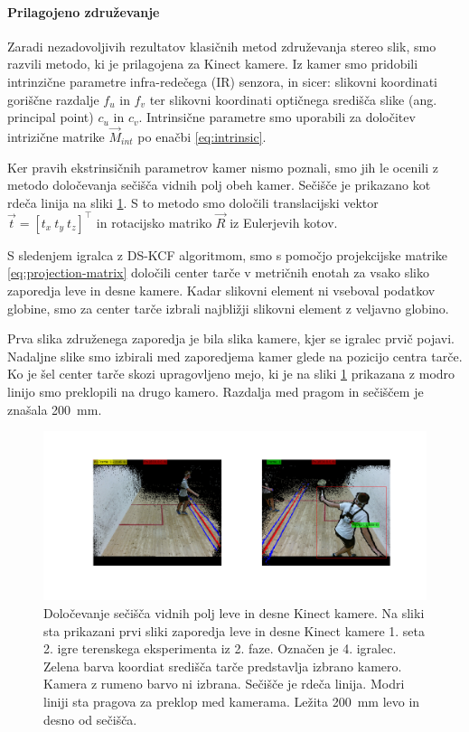 \paragraph{Prilagojeno združevanje}
Zaradi nezadovoljivih rezultatov klasičnih metod združevanja stereo slik, smo razvili metodo, ki je prilagojena za Kinect kamere. Iz kamer smo pridobili intrinzične parametre infra-redečega (IR) senzora, in sicer: slikovni koordinati goriščne razdalje $f_u$ in $f_v$ ter slikovni koordinati optičnega središča slike (ang. principal point) $c_u$ in $c_v$. Intrinsične parametre smo uporabili za določitev intrizične matrike $\vec{M}_{int}$ po enačbi \eqref{eq:intrinsic}.


Ker pravih ekstrinsičnih parametrov kamer nismo poznali, smo jih le ocenili z metodo določevanja sečišča vidnih polj obeh kamer. Sečišče je prikazano kot rdeča linija na sliki \ref{fig:zdruzevanje}. S to metodo smo določili translacijski vektor $\vec{t} = \left [ t_x~ t_y~ t_z \right]^\top$ in rotacijsko matriko $\vec{R}$ iz Eulerjevih kotov.

S sledenjem igralca z DS-KCF algoritmom, smo s pomočjo projekcijske matrike \eqref{eq:projection-matrix} določili center tarče v metričnih enotah za vsako sliko zaporedja leve in desne kamere. Kadar slikovni element ni vseboval podatkov globine, smo za center tarče izbrali najbližji slikovni element z veljavno globino.

Prva slika združenega zaporedja je bila slika kamere, kjer se igralec prvič pojavi. Nadaljne slike smo izbirali med zaporedjema kamer glede na pozicijo centra tarče. Ko je šel center tarče skozi upragovljeno mejo, ki je na sliki \ref{fig:zdruzevanje} prikazana z modro linijo smo preklopili na drugo kamero. Razdalja med pragom in sečiščem je znašala \SI{200}{mm}.


\begin{figure}[htb]
	\centering
	\includegraphics[width=\columnwidth]{./Slike/zdruzevanje-example.png}
	\caption[Določevanje sečišča vidnih polj leve in desne Kinect kamere]{Določevanje sečišča vidnih polj leve in desne Kinect kamere. Na sliki sta prikazani prvi sliki zaporedja leve in desne Kinect kamere 1. seta 2. igre terenskega eksperimenta iz 2. faze. Označen je 4. igralec. Zelena barva koordiat središča tarče predstavlja izbrano kamero. Kamera z rumeno barvo ni izbrana. Sečišče je rdeča linija. Modri liniji sta pragova za preklop med kamerama. Ležita \SI{200}{mm} levo in desno od sečišča.}
	\label{fig:zdruzevanje}
\end{figure}




